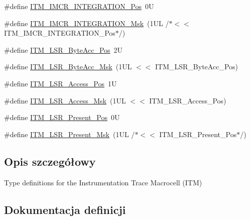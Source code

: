 \begin{DoxyCompactItemize}
\item 
\#define \hyperlink{group___c_m_s_i_s___i_t_m_ga08de02bf32caf48aaa29f7c68ff5d755}{I\+T\+M\+\_\+\+I\+M\+C\+R\+\_\+\+I\+N\+T\+E\+G\+R\+A\+T\+I\+O\+N\+\_\+\+Pos}~0U
\item 
\#define \hyperlink{group___c_m_s_i_s___i_t_m_ga8838bd3dd04c1a6be97cd946364a3fd2}{I\+T\+M\+\_\+\+I\+M\+C\+R\+\_\+\+I\+N\+T\+E\+G\+R\+A\+T\+I\+O\+N\+\_\+\+Msk}~(1\+U\+L /$\ast$$<$$<$ I\+T\+M\+\_\+\+I\+M\+C\+R\+\_\+\+I\+N\+T\+E\+G\+R\+A\+T\+I\+O\+N\+\_\+\+Pos$\ast$/)
\item 
\#define \hyperlink{group___c_m_s_i_s___i_t_m_gabfae3e570edc8759597311ed6dfb478e}{I\+T\+M\+\_\+\+L\+S\+R\+\_\+\+Byte\+Acc\+\_\+\+Pos}~2U
\item 
\#define \hyperlink{group___c_m_s_i_s___i_t_m_ga91f492b2891bb8b7eac5b58de7b220f4}{I\+T\+M\+\_\+\+L\+S\+R\+\_\+\+Byte\+Acc\+\_\+\+Msk}~(1\+U\+L $<$$<$ I\+T\+M\+\_\+\+L\+S\+R\+\_\+\+Byte\+Acc\+\_\+\+Pos)
\item 
\#define \hyperlink{group___c_m_s_i_s___i_t_m_ga144a49e12b83ad9809fdd2769094fdc0}{I\+T\+M\+\_\+\+L\+S\+R\+\_\+\+Access\+\_\+\+Pos}~1U
\item 
\#define \hyperlink{group___c_m_s_i_s___i_t_m_gac8ae69f11c0311da226c0c8ec40b3d37}{I\+T\+M\+\_\+\+L\+S\+R\+\_\+\+Access\+\_\+\+Msk}~(1\+U\+L $<$$<$ I\+T\+M\+\_\+\+L\+S\+R\+\_\+\+Access\+\_\+\+Pos)
\item 
\#define \hyperlink{group___c_m_s_i_s___i_t_m_gaf5740689cf14564d3f3fd91299b6c88d}{I\+T\+M\+\_\+\+L\+S\+R\+\_\+\+Present\+\_\+\+Pos}~0U
\item 
\#define \hyperlink{group___c_m_s_i_s___i_t_m_gaa5bc2a7f5f1d69ff819531f5508bb017}{I\+T\+M\+\_\+\+L\+S\+R\+\_\+\+Present\+\_\+\+Msk}~(1\+U\+L /$\ast$$<$$<$ I\+T\+M\+\_\+\+L\+S\+R\+\_\+\+Present\+\_\+\+Pos$\ast$/)
\end{DoxyCompactItemize}


\subsection{Opis szczegółowy}
Type definitions for the Instrumentation Trace Macrocell (I\+TM) 



\subsection{Dokumentacja definicji}
\mbox{\label{group___c_m_s_i_s___i_t_m_ga8838bd3dd04c1a6be97cd946364a3fd2}} 
